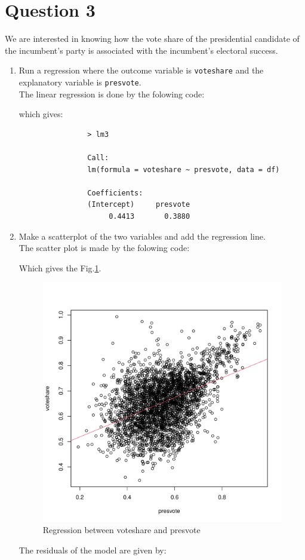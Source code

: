 \documentclass[12pt,letterpaper]{article}
\begin{document}
	\newpage	
\section*{Question 3}

\noindent We are interested in knowing how the vote share of the presidential candidate of the incumbent's party is associated with the incumbent's electoral success.
	\vspace{.25cm}
	\begin{enumerate}
		\item Run a regression where the outcome variable is \texttt{voteshare} and the explanatory variable is \texttt{presvote}.\\
			The linear regression is done by the folowing code:
			  
			which gives:
			\begin{verbatim}
				> lm3

				Call:
				lm(formula = voteshare ~ presvote, data = df)
				
				Coefficients:
				(Intercept)     presvote  
				     0.4413       0.3880  
			\end{verbatim}	
		\item Make a scatterplot of the two variables and add the regression line. \\
			The scatter plot is made by the folowing code:
			  
			Which gives the Fig.\ref{fig:lm_3}. \\
				
			\begin{figure}[h!]\centering
				\caption{\footnotesize Regression between voteshare and presvote}
				\label{fig:lm_3}
				\includegraphics[width=.85\textwidth]{lm3.pdf}
			\end{figure}
			The residuals of the model are given by:\\
			

\end{enumerate}
\end{document}
